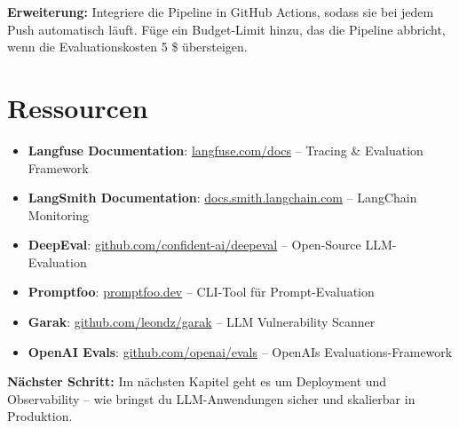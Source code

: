 \textbf{Erweiterung:} Integriere die Pipeline in GitHub Actions, sodass sie bei jedem Push automatisch läuft.
Füge ein Budget-Limit hinzu, das die Pipeline abbricht, wenn die Evaluationskosten 5 \$ übersteigen.

\section{Ressourcen}

\begin{itemize}[leftmargin=*]
    \item \textbf{Langfuse Documentation}: \href{https://langfuse.com/docs}{langfuse.com/docs} -- Tracing \& Evaluation Framework
    \item \textbf{LangSmith Documentation}: \href{https://docs.smith.langchain.com}{docs.smith.langchain.com} -- LangChain Monitoring
    \item \textbf{DeepEval}: \href{https://github.com/confident-ai/deepeval}{github.com/confident-ai/deepeval} -- Open-Source LLM-Evaluation
    \item \textbf{Promptfoo}: \href{https://www.promptfoo.dev}{promptfoo.dev} -- CLI-Tool für Prompt-Evaluation
    \item \textbf{Garak}: \href{https://github.com/leondz/garak}{github.com/leondz/garak} -- LLM Vulnerability Scanner
    \item \textbf{OpenAI Evals}: \href{https://github.com/openai/evals}{github.com/openai/evals} -- OpenAIs Evaluations-Framework
\end{itemize}

\textbf{Nächster Schritt:} Im nächsten Kapitel geht es um Deployment und Observability -- wie bringst du LLM-Anwendungen sicher und skalierbar in Produktion.
